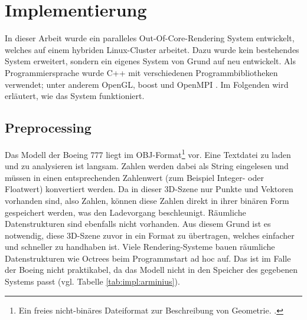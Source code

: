 
\chapter{Implementierung}
\label{chap:impl}
%

In dieser Arbeit wurde ein paralleles Out-Of-Core-Rendering System entwickelt, welches auf einem hybriden Linux-Cluster arbeitet. Dazu wurde kein bestehendes System erweitert, sondern ein eigenes System von Grund auf neu entwickelt. Als Programmiersprache wurde C++ mit verschiedenen Programmbibliotheken verwendet; unter anderem OpenGL, boost und OpenMPI \cite{mpi}. Im Folgenden wird erläutert, wie das System funktioniert.\\

\section{Preprocessing}
\label{sec:impl:preprocessing}
Das Modell der Boeing 777 liegt im OBJ-Format\footnote{Ein freies nicht-binäres Dateiformat zur Beschreibung von Geometrie. \cite{obj}. } vor. Eine Textdatei zu laden und zu analysieren ist langsam. Zahlen werden dabei als String eingelesen und müssen in einen entsprechenden Zahlenwert (zum Beispiel Integer- oder Floatwert) konvertiert werden. Da in dieser 3D-Szene nur Punkte und Vektoren vorhanden sind, also Zahlen, können diese Zahlen direkt in ihrer binären Form gespeichert werden, was den Ladevorgang beschleunigt. Räumliche Datenstrukturen sind ebenfalls nicht vorhanden. Aus diesem Grund ist es notwendig, diese 3D-Szene zuvor in ein Format zu übertragen, welches einfacher und schneller zu handhaben ist. Viele Rendering-Systeme bauen räumliche Datenstrukturen wie Octrees beim Programmstart ad hoc auf. Das ist im Falle der Boeing nicht praktikabel, da das Modell nicht in den Speicher des gegebenen Systems passt (vgl. Tabelle \ref{tab:impl:arminius}).

